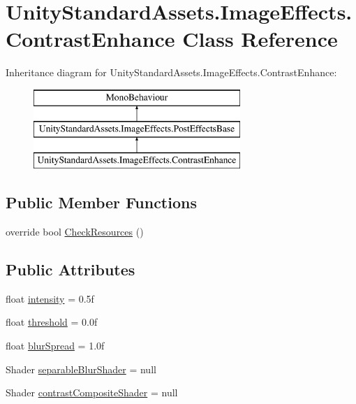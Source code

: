 \hypertarget{class_unity_standard_assets_1_1_image_effects_1_1_contrast_enhance}{}\section{Unity\+Standard\+Assets.\+Image\+Effects.\+Contrast\+Enhance Class Reference}
\label{class_unity_standard_assets_1_1_image_effects_1_1_contrast_enhance}
Inheritance diagram for Unity\+Standard\+Assets.\+Image\+Effects.\+Contrast\+Enhance\+:\begin{figure}[H]
\begin{center}
\leavevmode
\includegraphics[height=3.000000cm]{class_unity_standard_assets_1_1_image_effects_1_1_contrast_enhance}
\end{center}
\end{figure}
\subsection*{Public Member Functions}
\begin{DoxyCompactItemize}
\item 
override bool \mbox{\hyperlink{class_unity_standard_assets_1_1_image_effects_1_1_contrast_enhance_adfe9a436236fbb2df7edfbeaa7490406}{Check\+Resources}} ()
\end{DoxyCompactItemize}
\subsection*{Public Attributes}
\begin{DoxyCompactItemize}
\item 
float \mbox{\hyperlink{class_unity_standard_assets_1_1_image_effects_1_1_contrast_enhance_a2c111b940711f3bdc70bbd87dbd8be26}{intensity}} = 0.\+5f
\item 
float \mbox{\hyperlink{class_unity_standard_assets_1_1_image_effects_1_1_contrast_enhance_ac3dfa3fdad364df1349c4a44fde9efba}{threshold}} = 0.\+0f
\item 
float \mbox{\hyperlink{class_unity_standard_assets_1_1_image_effects_1_1_contrast_enhance_a61052c2aefde0fd4982419fc202e3e67}{blur\+Spread}} = 1.\+0f
\item 
Shader \mbox{\hyperlink{class_unity_standard_assets_1_1_image_effects_1_1_contrast_enhance_ab4a16c1632ba44168d9412b68e8878e9}{separable\+Blur\+Shader}} = null
\item 
Shader \mbox{\hyperlink{class_unity_standard_assets_1_1_image_effects_1_1_contrast_enhance_ae7c1ed29c23cf5ee0599286445d9b9f5}{contrast\+Composite\+Shader}} = null
\end{DoxyCompactItemize}

